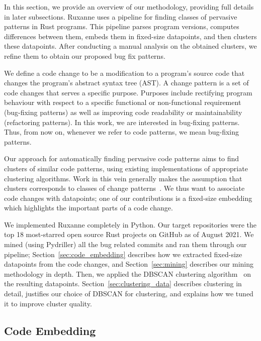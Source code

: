 In this section, we provide an overview of our methodology, providing full details in later subsections. Ruxanne uses a pipeline for finding classes of pervasive patterns in Rust programs. This pipeline parses program versions, computes differences between them, embeds them in fixed-size datapoints, and then clusters these datapoints. After conducting a manual analysis on the obtained clusters, we refine them to obtain our proposed bug fix patterns.

We define a code change to be a modification to a program's source code that changes the program's abstract syntax tree (AST). A change pattern is a set of code changes that serves a specific purpose. Purposes include rectifying program behaviour with respect to a specific functional or non-functional requirement (bug-fixing patterns) as well as improving code readability or maintainability (refactoring patterns). In this work, we are interested in bug-fixing patterns. Thus, from now on, whenever we refer to code patterns, we mean bug-fixing patterns.

Our approach for automatically finding pervasive code patterns aims to find clusters of similar code patterns, using existing implementations of appropriate clustering algorithms. Work in this vein generally makes the assumption that clusters corresponds to classes of change patterns~\citep{hanam2016discovering,campos2019discovering,yang2022mining}. We thus want to associate code changes with datapoints; one of our contributions is a fixed-size embedding which highlights the important parts of a code change.


We implemented Ruxanne completely in Python. Our target repositories were the top 18 most-starred open source Rust projects on GitHub as of August 2021. We mined (using Pydriller) all the bug related commits and ran them through our pipeline; Section~\ref{sec:code_embedding} describes how we extracted fixed-size datapoints from the code changes, and Section~\ref{sec:mining} describes our mining methodology in depth. Then, we applied the DBSCAN clustering algorithm~\citep{ester1996density} on the resulting datapoints. Section~\ref{sec:clustering_data} describes clustering in detail, justifies our choice of DBSCAN for clustering, and explains how we tuned it to improve cluster quality. 

\subsection{\label{sec:code_embedding}Code Embedding}

